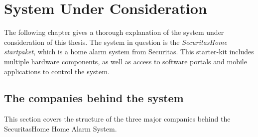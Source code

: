 \chapter{System Under Consideration} \label{ch:system}
The following chapter gives a thorough explanation of the system under consideration of this thesis. The system in question is the \textit{SecuritasHome startpaket}, which is a home alarm system from Securitas. This starter-kit includes multiple hardware components, as well as access to software portals and mobile applications to control the system.

\section{The companies behind the system}
This section covers the structure of the three major companies behind the SecuritasHome Home Alarm System.

